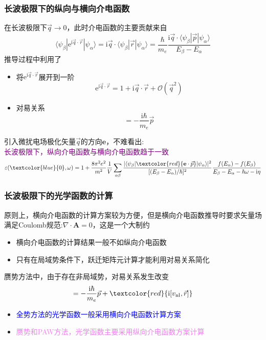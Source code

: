 {\frame
{
	\frametitle{长波极限下的纵向与横向介电函数}
	在长波极限下$\vec q\rightarrow0$，此时介电函数的主要贡献来自
	\begin{displaymath}
		\langle\psi_{\beta}|\mathrm{e}^{\mathrm{i}\vec q\cdot\vec r}|\psi_{\alpha}\rangle=\mathrm{i}\vec q\cdot\langle\psi_{\beta}|\vec r|\psi_{\alpha}\rangle=\frac{\hbar}{m_e}\frac{\mathrm{i}\vec q\cdot\langle\psi_{\beta}|\vec p|\psi_{\alpha}\rangle}{E_{\beta}-E_{\alpha}}
	\end{displaymath}
	推导过程中利用了
	\begin{itemize}
		\item 将$\mathrm{e}^{\mathrm{i}\vec q\cdot\vec r}$展开到一阶
			\begin{displaymath}
				\mathrm{e}^{\mathrm{i}\vec q\cdot\vec r}=1+\mathrm{i}\vec q\cdot\vec r+\mathcal{O}(\vec q^2)
			\end{displaymath}
		\item 对易关系
			\begin{displaymath}
				[H_0,\vec r]=-\frac{\mathrm{i}\hbar}{m_e}\vec p
			\end{displaymath}
	\end{itemize}
	引入微扰电场极化矢量$\vec q$的方向$\mathbf{e}$，不难看出:\\
	\textcolor{purple}{长波极限下，纵向介电函数与横向介电函数趋于一致}
	\begin{displaymath}
		\varepsilon(\textcolor{blue}{0},\omega)=1+\frac{8\pi^2e^2}{m^2}\frac1V\sum_{\alpha\beta}\frac{|\langle\psi_{\beta}|\textcolor{red}{\mathbf{e}\cdot\vec p}|\psi_{\alpha}\rangle|^2}{[(E_{\beta}-E_{\alpha})/\hbar]^2}\frac{f(E_{\alpha})-f(E_{\beta})}{E_{\beta}-E_{\alpha}-\hbar\omega-\mathrm{i}\eta}
	\end{displaymath}
}

\frame
{
	\frametitle{长波极限下的光学函数的计算}
	原则上，横向介电函数的计算方案较为方便，但是横向介电函数推导时要求矢量场满足\textrm{Coulomb}规范:$\nabla\cdot\mathbf{A}=0$，这是一个大制约
	\begin{itemize}
		\item 横向介电函数的计算结果一般不如纵向介电函数
		\item 只有在局域势条件下，跃迁矩阵元计算才能利用对易关系简化
	\end{itemize}
	赝势方法中，由于存在非局域势，对易关系发生改变
	\begin{displaymath}
		[H,\vec r]=-\frac{\mathrm{i}\hbar}{m_e}\vec p+\textcolor{red}{\mathrm{i}[v_{\mathrm{nl}},\vec r]}
	\end{displaymath}
	\begin{itemize}
		\item \textcolor{blue}{全势方法的光学函数一般采用横向介电函数计算方案}
		\item \textcolor{violet}{赝势和\textrm{PAW}方法，光学函数主要采用纵向介电函数方案计算}
	\end{itemize}
}

}
